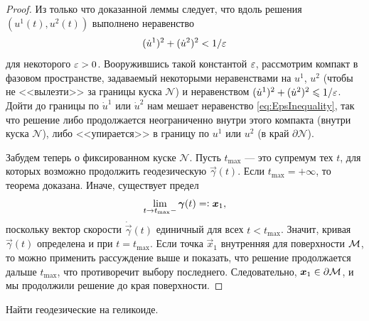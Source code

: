 \begin{proof}
	Из только что доказанной леммы следует, что вдоль решения $(u^1(t), u^2(t))$ выполнено неравенство
	\begin{equation} \label{eq:EpsInequality}
		(\dot{u}^1)^2 + (\dot{u}^2)^2 < 1 / \eps
	\end{equation}
	для некоторого $\eps > 0$. Вооружившись такой константой $\eps$, рассмотрим компакт в фазовом пространстве, задаваемый некоторыми неравенствами на $u^1$, $u^2$ (чтобы не <<вылезти>> за границы куска $\mathcal{N}$) и неравенством $(\dot{u}^1)^2 + (\dot{u}^2)^2 \leqslant 1 / \eps$. Дойти до границы по $\dot{u}^1$ или $\dot{u}^2$ нам мешает неравенство \eqref{eq:EpsInequality}, так что решение либо продолжается неограниченно внутри этого компакта (внутри куска $\mathcal{N}$), либо <<упирается>> в границу по $u^1$ или $u^2$ (в край $\partial\mathcal{N}$).

	Забудем теперь о фиксированном куске $\mathcal{N}$. Пусть $t_{\max}$ --- это супремум тех $t$, для которых возможно продолжить геодезическую $\vec{\gamma}(t)$. Если $t_{\max} = +\infty$, то теорема доказана. Иначе, существует предел
	\[
		\lim_{t \to t_{\max}-}\vec{\gamma}(t) = \vcentcolon \vec{x}_1,
	\]
	поскольку вектор скорости $\dot{\vec{\gamma}}(t)$ единичный для всех $t < t_{\max}$. Значит, кривая $\vec{\gamma}(t)$ определена и при $t = t_{\max}$. Если точка $\vec{x}_1$ внутренняя для поверхности $\M$, то можно применить рассуждение выше и показать, что решение продолжается дальше $t_{\max}$, что противоречит выбору последнего. Следовательно, $\vec{x}_1 \in \partial\M$, и мы продолжили решение до края поверхности.
\end{proof}


\begin{problem}
	Найти геодезические на геликоиде.
\end{problem}

